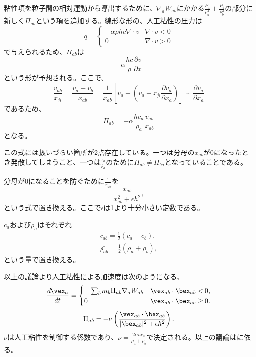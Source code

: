 \documentclass[]{jsarticle}
\begin{document}
粘性項を粒子間の相対運動から導出するために、$\nabla_aW_{ab}$にかかる$\frac{P_a}{\rho_a^2}+\frac{P_b}{\rho_b^2}$の部分に新しく$\Pi_{ab}$という項を追加する。線形な形の、人工粘性の圧力は
\begin{equation}
  q=\begin{cases}
    -\alpha \rho h c \nabla \cdot v & \nabla\cdot v<0 \\
    0 & \nabla \cdot v>0
  \end{cases}
\end{equation}
で与えられるため、$\Pi_{ab}$は
\begin{equation}
  -\alpha \frac{hc}{\rho}\frac{\partial v}{\partial x}
\end{equation}
という形が予想される。ここで、
\begin{equation}
  \frac{v_{ab}}{x_{ji}}=\frac{v_a-v_b}{x_{ab}}=\frac{1}{x_{ab}}\left[ v_a-\left( v_a+x_{ji}\frac{\partial v_a}{\partial x_a} \right) \right] \sim \frac{\partial v_a}{\partial x_a}
\end{equation}
であるため、
\begin{equation}
\Pi_{ab}=-\alpha \frac{hc_a}{\rho_a}\frac{v_{ab}}{x_{ab}}
\end{equation}
となる。

この式には扱いづらい箇所が2点存在している。一つは分母の$x_{ab}$が$0$になったとき発散してしまうこと、一つは$\frac{c_a}{\rho_a}$のために$\Pi_{ab}\neq\Pi_{ba}$となっていることである。

分母が0になることを防ぐために$\frac{1}{x_{ab}}$を
\begin{equation}
\frac{x_{ab}}{x_{ab}^2+\epsilon h^2},
\end{equation}
という式で置き換える。ここで$\epsilon$は1より十分小さい定数である。

$c_a$および$\rho_a$はそれぞれ
\begin{equation}
  \begin{split}
  \bar{c_{ab}}=\frac{1}{2}(c_a+c_b), \\
  \bar{\rho_{ab}}=\frac{1}{2}(\rho_a+\rho_b),
  \end{split}
\end{equation}
という量で置き換える。

以上の議論より人工粘性による加速度は次のようになる、
\begin{equation}
\frac{d\vex_a}{dt}=\begin{cases}
  -\sum_bm_b\Pi_{ab}\nabla_aW_{ab} & \vex_{ab}\cdot\bex_{ab}<0, \\
  0 & \vex_{ab}\cdot\bex_{ab}\geq0.
\end{cases}
\end{equation}
\begin{equation}
\Pi_{ab}=-\nu\left(\frac{\vex_{ab}\cdot\bex_{ab}}{|\bex_{ab}|^2+\epsilon h^2}\right).
\end{equation}
$\nu$は人工粘性を制御する係数であり、$\nu=\frac{2\alpha h c_s}{\rho_a+\rho_b}$で決定される。以上の議論は\cite{Monaghan1983}に依る。
\end{document}
